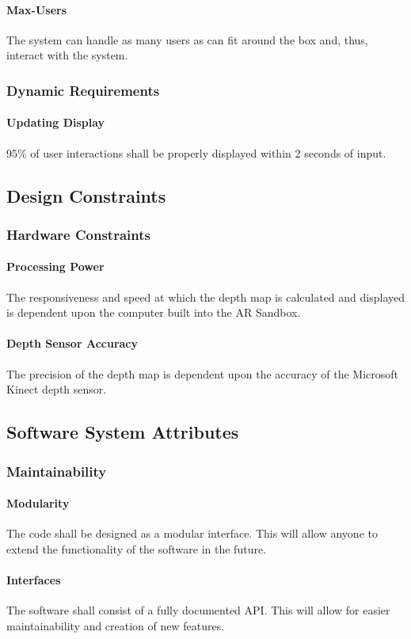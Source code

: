 \documentclass[onecolumn, draftclsnofoot,10pt, compsoc]{IEEEtran}
\begin{document}
\paragraph{Max-Users}
The system can handle as many users as can fit around the box and, thus, interact with the system.
\subsubsection{Dynamic Requirements}
\paragraph{Updating Display}
95\% of user interactions shall be properly displayed within 2 seconds of input.

\subsection{Design Constraints}
\subsubsection{Hardware Constraints}
\paragraph{Processing Power}
The responsiveness and speed at which the depth map is calculated and displayed is dependent upon the computer built into the AR Sandbox. 
\paragraph{Depth Sensor Accuracy}
The precision of the depth map is dependent upon the accuracy of the Microsoft Kinect depth sensor.

\subsection{Software System Attributes}
\subsubsection{Maintainability}
\paragraph{Modularity}
The code shall be designed as a modular interface. This will allow anyone to extend the functionality of the software in the future.
\paragraph{Interfaces}
The software shall consist of a fully documented API. This will allow for easier maintainability and creation of new features.
\end{document}
